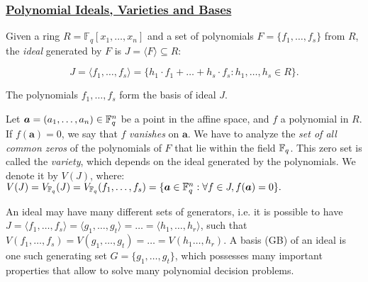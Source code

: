 \subsubsection{\underline{Polynomial Ideals, Varieties and \Grobner
    Bases}}

\begin{Definition}
Given a ring $R=\mathbb{F}_q[x_1,\dots, x_n]$ and a set of polynomials
$F=\{f_1,\dots,f_s\}$ from $R$, the {\it ideal} generated by $F$ is $J =
\langle F \rangle \subseteq R$: 
\vspace{-0.2in}

{\small
\begin{equation}
J = \langle f_1, \dots, f_s \rangle = \{ h_1\cdot f_1 + \dots+h_s\cdot
f_s:  h_1,\dots,h_s\in R\}.
\end{equation}
}
\vspace{-0.2in}

The polynomials $f_1,\dots,f_s$ form the basis of ideal $J$.
\end{Definition}

Let $\bm{a} = (a_1,\dots,a_n) \in {\mathbb{F}}_{q}^n$ be a point in the affine
space, and $f$ a polynomial in $R$. If $f(\bm{a}) = 0$, we say
that $f$ {\it vanishes} on $\bm{a}$. We have to
analyze the {\it set of all common zeros} of the polynomials of $F$
that lie %
within the field ${\mathbb{F}}_{q}$. This zero set is called the {\it variety}, which depends on the
ideal generated by the polynomials. We denote it by $V(J)$, where: $ V(J)= V_{{\mathbb{F}}_{q}}(J) =
V_{{\mathbb{F}}_{q}}(f_1,\dots,f_s) = \{\bm{a} \in {\mathbb{F}}_{q}^n: \forall
f \in J, f(\bm{a}) = 0\}.$

An ideal may have many different sets of generators, i.e. it is
possible to have $J = \langle f_1, \dots, f_s\rangle = \langle g_1,
\dots, g_t \rangle = \dots = \langle h_1,\dots, h_r\rangle$, such that
$V(f_1,\dots,f_s)= V(g_1,\dots,g_t)=\dots=V(h_1\dots,h_r)$. A \Grobner
basis (GB) of an ideal is one such generating set $G=\{g_1, \dots,
g_t\}$, which possesses many important properties that allow to solve
many polynomial decision problems. 


